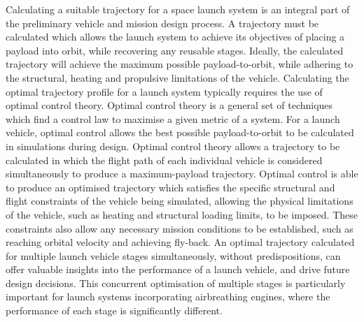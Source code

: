   Calculating a suitable trajectory for a space launch system is an integral part of the preliminary vehicle and mission design process. 
  A trajectory must be calculated which allows the launch system to achieve its objectives of placing a payload into orbit, while recovering any reusable stages.
  Ideally, the calculated trajectory will achieve the maximum possible payload-to-orbit, while adhering to the structural, heating and propulsive limitations of the vehicle.  
  Calculating the optimal trajectory profile for a launch system typically requires the use of optimal control theory. 
    Optimal control theory is a general set of techniques which find a control law to maximise a given metric of a system. For a launch vehicle, optimal control allows the best possible payload-to-orbit to be calculated in simulations during design.
  Optimal control theory allows a trajectory to be calculated in which the flight path of each individual vehicle is considered simultaneously to produce a maximum-payload trajectory. 
  Optimal control is able to produce an optimised trajectory which satisfies the specific structural and flight constraints of the vehicle being simulated, allowing the physical limitations of the vehicle, such as heating and structural loading limits, to be imposed. These constraints also allow any necessary mission conditions to be established, such as reaching orbital velocity and achieving fly-back. 
  An optimal trajectory calculated for multiple launch vehicle stages simultaneously, without predispositions, can offer valuable insights into the performance of a launch vehicle, and drive future design decisions. 
  This concurrent optimisation of multiple stages is particularly important for launch systems incorporating airbreathing engines, where the performance of each stage is significantly different.  
  



  
  
